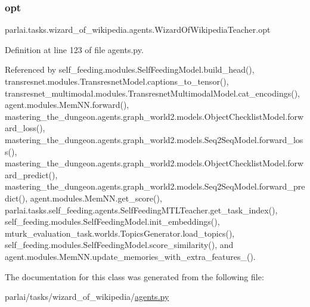 \subsubsection{\texorpdfstring{opt}{opt}}
{\footnotesize\ttfamily parlai.\+tasks.\+wizard\+\_\+of\+\_\+wikipedia.\+agents.\+Wizard\+Of\+Wikipedia\+Teacher.\+opt}



Definition at line 123 of file agents.\+py.



Referenced by self\+\_\+feeding.\+modules.\+Self\+Feeding\+Model.\+build\+\_\+head(), transresnet.\+modules.\+Transresnet\+Model.\+captions\+\_\+to\+\_\+tensor(), transresnet\+\_\+multimodal.\+modules.\+Transresnet\+Multimodal\+Model.\+cat\+\_\+encodings(), agent.\+modules.\+Mem\+N\+N.\+forward(), mastering\+\_\+the\+\_\+dungeon.\+agents.\+graph\+\_\+world2.\+models.\+Object\+Checklist\+Model.\+forward\+\_\+loss(), mastering\+\_\+the\+\_\+dungeon.\+agents.\+graph\+\_\+world2.\+models.\+Seq2\+Seq\+Model.\+forward\+\_\+loss(), mastering\+\_\+the\+\_\+dungeon.\+agents.\+graph\+\_\+world2.\+models.\+Object\+Checklist\+Model.\+forward\+\_\+predict(), mastering\+\_\+the\+\_\+dungeon.\+agents.\+graph\+\_\+world2.\+models.\+Seq2\+Seq\+Model.\+forward\+\_\+predict(), agent.\+modules.\+Mem\+N\+N.\+get\+\_\+score(), parlai.\+tasks.\+self\+\_\+feeding.\+agents.\+Self\+Feeding\+M\+T\+L\+Teacher.\+get\+\_\+task\+\_\+index(), self\+\_\+feeding.\+modules.\+Self\+Feeding\+Model.\+init\+\_\+embeddings(), mturk\+\_\+evaluation\+\_\+task.\+worlds.\+Topics\+Generator.\+load\+\_\+topics(), self\+\_\+feeding.\+modules.\+Self\+Feeding\+Model.\+score\+\_\+similarity(), and agent.\+modules.\+Mem\+N\+N.\+update\+\_\+memories\+\_\+with\+\_\+extra\+\_\+features\+\_\+().



The documentation for this class was generated from the following file\+:\begin{DoxyCompactItemize}
\item 
parlai/tasks/wizard\+\_\+of\+\_\+wikipedia/\hyperlink{parlai_2tasks_2wizard__of__wikipedia_2agents_8py}{agents.\+py}\end{DoxyCompactItemize}
